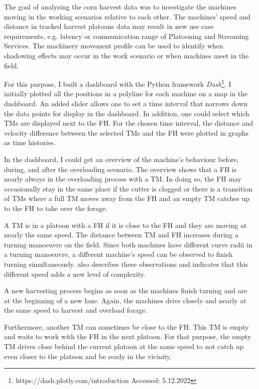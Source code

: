 The goal of analysing the corn harvest data was to investigate the machines moving in the working scenarios relative to each other. The machines' speed and distance in tracked harvest platoons data may result in new use case requirements, e.g. latency or communication range of Platooning and Streaming Services. The machinery movement profile can be used to identify when shadowing effects may occur in the work scenario or when machines meet in the field.

For this purpose, I built a dashboard with the Python framework \textit{Dash}\footnote{https://dash.plotly.com/introduction Accessed: 5.12.2022}. I initially plotted all the positions in a polyline for each machine
on a map in the dashboard. An added slider allows one to set a time interval that narrows down the data points for display in the dashboard. In addition, one could select which \ac{TM}s are displayed next to the \ac{FH}. For the chosen time interval, the distance and velocity difference between the selected \ac{TM}s and the \ac{FH} were plotted in graphs as time histories.

In the dashboard, I could get an overview of the machine's behaviour 
before, during, and after the overloading scenario.
The overview shows that a \ac{FH} is nearly always in the overloading process with a \ac{TM}. In doing so, the \ac{FH} may occasionally stay in the same place if the cutter is clogged or there is a transition of \ac{TM}s where a full \ac{TM} moves away from the \ac{FH} and an empty \ac{TM} catches up to the \ac{FH} to take over the forage.

A \ac{TM} is in a platoon with a \ac{FH} if it is close to the \ac{FH} and they are moving at nearly the same speed. The distance between \ac{TM} and \ac{FH} increases during a turning manoeuvre on the field. Since both machines have different curve radii in a turning manoeuvre, a different machine's speed can be observed to finish turning simultaneously.
\textcite{smolnik_5g_2020} also describes these observations and indicates that this different speed adds a new level of complexity.

A new harvesting process begins as soon as the machines finish turning and are at the beginning of a new lane.
Again, the machines drive closely and nearly at the same speed to harvest and overload forage.

Furthermore, another \ac{TM} can sometimes be close to the \ac{FH}. This \ac{TM} is empty and waits to work with the \ac{FH} in the next platoon. For that purpose, the empty \ac{TM} drives close behind the current platoon at the same speed to not catch up even closer to the platoon and be ready in the vicinity.

